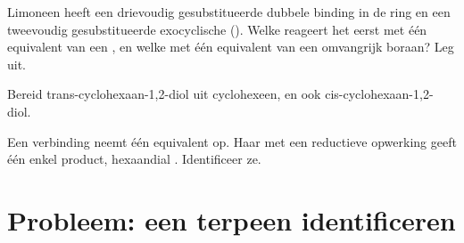 \begin{exercise}[$\star\star\star$]\label{exo:b2:alkene-redox:10}
Limoneen heeft een drievoudig gesubstitueerde dubbele binding in de ring en een tweevoudig gesubstitueerde exocyclische
(). Welke reageert het eerst met één equivalent van een , en welke met
één equivalent van een omvangrijk boraan? Leg uit.
\end{exercise}

\begin{exercise}[$\star\star\star$]\label{exo:b2:alkene-redox:11}
Bereid trans-cyclohexaan-1,2-diol uit cyclohexeen, en ook cis-cyclohexaan-1,2-diol.
\end{exercise}

\begin{exercise}[$\star\star\star$]\label{exo:b2:alkene-redox:12}
Een verbinding  neemt één equivalent  op. Haar  met een reductieve
opwerking geeft één enkel product, hexaandial . Identificeer ze.
\end{exercise}

\section{Probleem: een terpeen identificeren}

